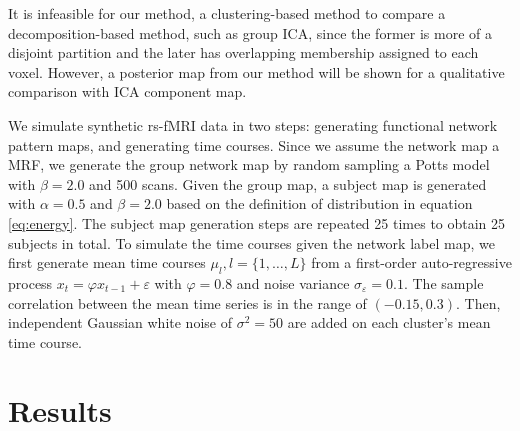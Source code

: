 \documentclass[final,authoryear,5p,twocolumn]{elsarticle}
\begin{document}
It is infeasible for our method, a clustering-based method to compare a
decomposition-based method, such as group ICA, since the former is more of a
disjoint partition and the later has overlapping membership assigned to each
voxel. However, a posterior map from our method will be shown for a qualitative
comparison with ICA component map.


We simulate synthetic rs-fMRI data in two steps: generating functional network
pattern maps, and generating time courses. Since we assume the network map a
MRF, we generate the group network map by random sampling a Potts model with
$\beta = 2.0$ and 500 scans. Given the group map, a subject map is generated
with $\alpha=0.5$ and $\beta = 2.0$ based on the definition of distribution in
equation \ref{eq:energy}. The subject map generation steps are repeated 25 times
to obtain 25 subjects in total. To simulate the time courses given the network
label map, we first generate mean time courses $\mu_l, l=\{1,\dots, L\}$ from a
first-order auto-regressive process $x_t = \varphi x_{t-1} + \varepsilon$ with
$\varphi = 0.8$ and noise variance $\sigma_{\varepsilon} = 0.1$. The sample
correlation between the mean time series is in the range of $(-0.15,
0.3)$. Then, independent Gaussian white noise of $\sigma^2 = 50$ are added on
each cluster's mean time course.


\section{Results}
\end{document}
